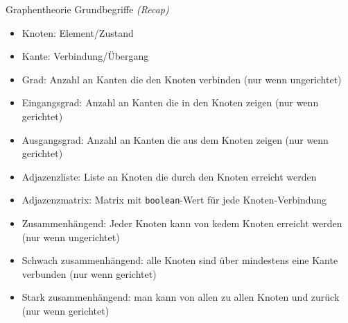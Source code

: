 \documentclass[aspectratio=169]{beamer}
\begin{document}
\begin{frame}{Graphentheorie}
    Grundbegriffe \textit{(Recap)}
    \begin{itemize}
        \item Knoten: Element/Zustand
        \pause
        \item Kante: Verbindung/Übergang
        \pause
        \item Grad: Anzahl an Kanten die den Knoten verbinden (nur wenn ungerichtet)
        \pause
        \item Eingangsgrad: Anzahl an Kanten die in den Knoten zeigen (nur wenn gerichtet)
        \pause
        \item Ausgangsgrad: Anzahl an Kanten die aus dem Knoten zeigen (nur wenn gerichtet)
        \pause
        \item Adjazenzliste: Liste an Knoten die durch den Knoten erreicht werden
        \pause
        \item Adjazenzmatrix: Matrix mit \texttt{boolean}-Wert für jede Knoten-Verbindung
        \pause
        \item Zusammenhängend: Jeder Knoten kann von kedem Knoten erreicht werden (nur wenn ungerichtet)
        \pause
        \item Schwach zusammenhängend: alle Knoten sind über mindestens eine Kante verbunden (nur wenn gerichtet)
        \item Stark zusammenhängend: man kann von allen zu allen Knoten und zurück (nur wenn gerichtet)
    \end{itemize}
\end{frame}
\end{document}
